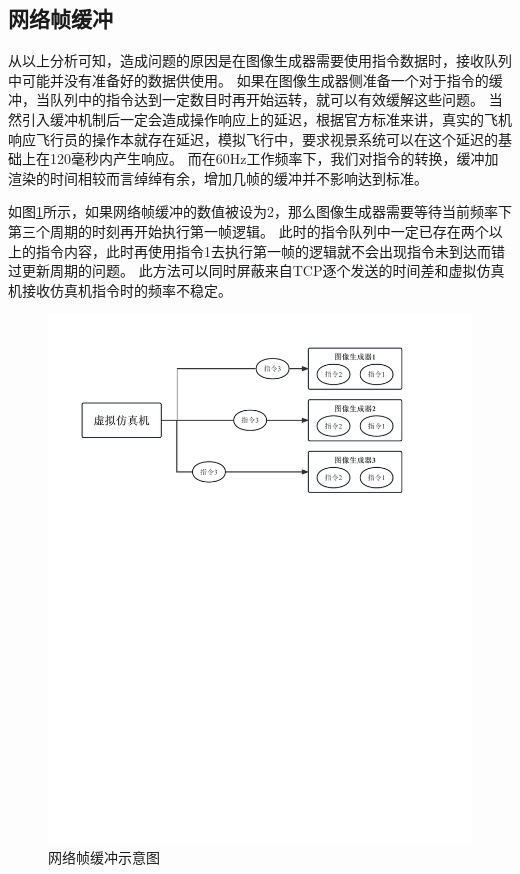 \subsection{网络帧缓冲}
从以上分析可知，造成问题的原因是在图像生成器需要使用指令数据时，接收队列中可能并没有准备好的数据供使用。
如果在图像生成器侧准备一个对于指令的缓冲，当队列中的指令达到一定数目时再开始运转，就可以有效缓解这些问题。
当然引入缓冲机制后一定会造成操作响应上的延迟，根据官方标准来讲，真实的飞机响应飞行员的操作本就存在延迟，模拟飞行中，要求视景系统可以在这个延迟的基础上在120毫秒内产生响应。
而在60Hz工作频率下，我们对指令的转换，缓冲加渲染的时间相较而言绰绰有余，增加几帧的缓冲并不影响达到标准。
\clearpage
\par
如图\ref{framebuffer}所示，如果网络帧缓冲的数值被设为2，那么图像生成器需要等待当前频率下第三个周期的时刻再开始执行第一帧逻辑。
此时的指令队列中一定已存在两个以上的指令内容，此时再使用指令1去执行第一帧的逻辑就不会出现指令未到达而错过更新周期的问题。
此方法可以同时屏蔽来自TCP逐个发送的时间差和虚拟仿真机接收仿真机指令时的频率不稳定。
\begin{figure}[h!]
    \begin{center}
        \includegraphics[width=\textwidth]{pictures/framebuffer.pdf}
        \caption{网络帧缓冲示意图}
        \label{framebuffer}
    \end{center}
\end{figure}
